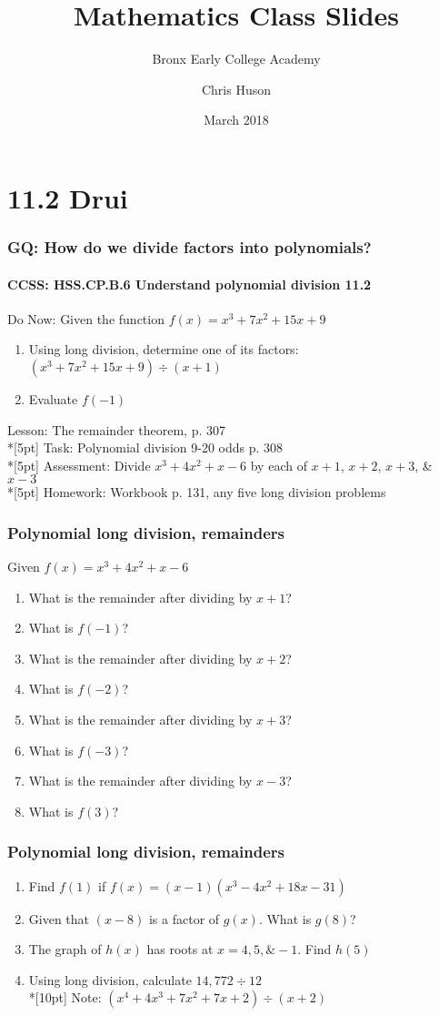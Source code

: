 \documentclass{beamer}
\title{Mathematics Class Slides}
\subtitle{Bronx Early College Academy}
\author{Chris Huson}
\date{March 2018}
\begin{document}
\frame{\titlepage}


\section{11.2 Drui}
\frame
{
  \frametitle{GQ: How do we divide factors into polynomials?}
  \framesubtitle{CCSS: HSS.CP.B.6 Understand polynomial division \qquad \qquad \qquad \alert{11.2}}

  \begin{block}{Do Now: Given the function $f(x)=x^3+7x^2+15x+9$}
    \begin{enumerate}
    \item Using long division, determine one of its factors: $(x^3+7x^2+15x+9) \div (x+1)$ 
    \item Evaluate $f(-1)$
    \end{enumerate}
  \end{block}
  Lesson: The remainder theorem, p. 307\\*[5pt]
  Task: Polynomial division 9-20 odds p. 308\\*[5pt]
  Assessment: Divide $x^3+4x^2+x-6$ by each of $x+1$, $x+2$, $x+3$, \& $x-3$\\*[5pt]
  Homework: Workbook p. 131, any five long division problems
}

\frame
{
  \frametitle{Polynomial long division, remainders }
  
    \begin{block}{Given $f(x)=x^3+4x^2+x-6$} 
        \begin{enumerate}
            \item What is the remainder after dividing by $x+1$?
            \item What is $f(-1)$?
            \item What is the remainder after dividing by $x+2$?
            \item What is $f(-2)$?
            \item What is the remainder after dividing by $x+3$?
            \item What is $f(-3)$?
            \item What is the remainder after dividing by $x-3$?
            \item What is $f(3)$?
        \end{enumerate}
    \end{block}
}

\frame
{
  \frametitle{Polynomial long division, remainders }
\begin{enumerate}
    \item Find $f(1)$ if $f(x)=(x-1)(x^3-4x^2+18x-31)$
    \item Given that $(x-8)$ is a factor of $g(x)$. What is $g(8)$?
    \item The graph of $h(x)$ has roots at $x=4, 5, \& -1$. Find $h(5)$
    \item Using long division, calculate $14,772 \div 12$\\*[10pt] 
    Note: $(x^4+4x^3+7x^2+7x+2) \div (x+2)$
\end{enumerate}

}
\end{document}
